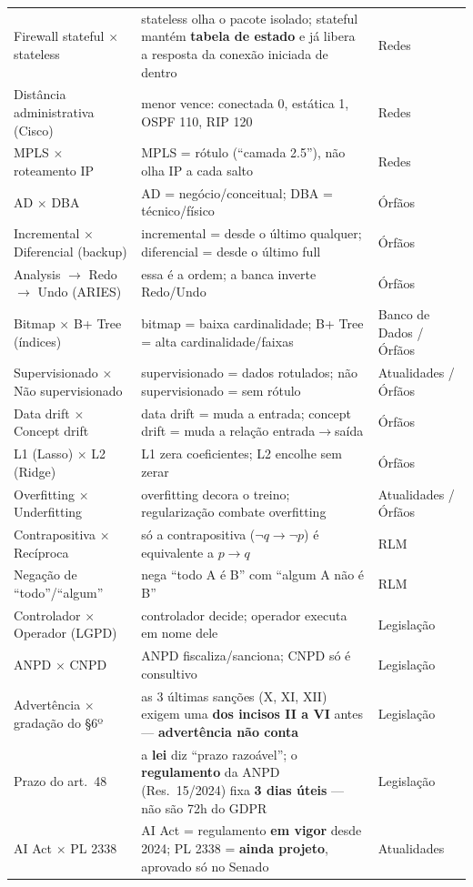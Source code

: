 \begin{longtable}{@{}p{3.3cm}p{6.1cm}p{2.6cm}@{}}
Firewall stateful $\times$ stateless & stateless olha o pacote isolado; stateful mantém \textbf{tabela de estado} e já libera a resposta da conexão iniciada de dentro & Redes \\
Distância administrativa (Cisco) & menor vence: conectada 0, estática 1, OSPF 110, RIP 120 & Redes \\
MPLS $\times$ roteamento IP & MPLS = rótulo (``camada 2.5''), não olha IP a cada salto & Redes \\
AD $\times$ DBA & AD = negócio/conceitual; DBA = técnico/físico & Órfãos \\
Incremental $\times$ Diferencial (backup) & incremental = desde o último qualquer; diferencial = desde o último full & Órfãos \\
Analysis $\to$ Redo $\to$ Undo (ARIES) & essa é a ordem; a banca inverte Redo/Undo & Órfãos \\
Bitmap $\times$ B+ Tree (índices) & bitmap = baixa cardinalidade; B+ Tree = alta cardinalidade/faixas & Banco de Dados / Órfãos \\
Supervisionado $\times$ Não supervisionado & supervisionado = dados rotulados; não supervisionado = sem rótulo & Atualidades / Órfãos \\
Data drift $\times$ Concept drift & data drift = muda a entrada; concept drift = muda a relação entrada$\to$saída & Órfãos \\
L1 (Lasso) $\times$ L2 (Ridge) & L1 zera coeficientes; L2 encolhe sem zerar & Órfãos \\
Overfitting $\times$ Underfitting & overfitting decora o treino; regularização combate overfitting & Atualidades / Órfãos \\
Contrapositiva $\times$ Recíproca & só a contrapositiva ($\lnot q \to \lnot p$) é equivalente a $p \to q$ & RLM \\
Negação de ``todo''/``algum'' & nega ``todo A é B'' com ``algum A não é B'' & RLM \\
Controlador $\times$ Operador (LGPD) & controlador decide; operador executa em nome dele & Legislação \\
ANPD $\times$ CNPD & ANPD fiscaliza/sanciona; CNPD só é consultivo & Legislação \\
Advertência $\times$ gradação do §6º & as 3 últimas sanções (X, XI, XII) exigem uma \textbf{dos incisos II a VI} antes --- \textbf{advertência não conta} & Legislação \\
Prazo do art.\ 48 & a \textbf{lei} diz ``prazo razoável''; o \textbf{regulamento} da ANPD (Res.\ 15/2024) fixa \textbf{3 dias úteis} --- não são 72h do GDPR & Legislação \\
AI Act $\times$ PL 2338 & AI Act = regulamento \textbf{em vigor} desde 2024; PL 2338 = \textbf{ainda projeto}, aprovado só no Senado & Atualidades \\
\bottomrule
\end{longtable}

